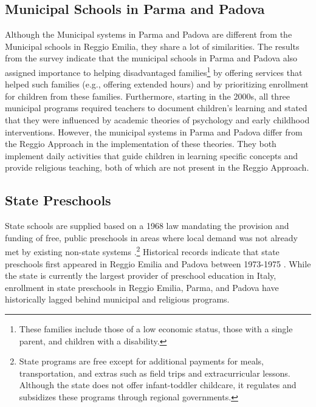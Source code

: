 \subsection{Municipal Schools in Parma and Padova}
Although the Municipal systems in Parma and Padova are different from the Municipal schools in Reggio Emilia, they share a lot of similarities. The results from the survey indicate that the municipal schools in Parma and Padova also assigned importance to helping disadvantaged families\footnote{These families include those of a low economic status, those with a single parent, and children with a disability.} by offering services that helped such families (e.g., offering extended hours) and by prioritizing enrollment for children from these families. Furthermore, starting in the 2000s, all three municipal programs required teachers to document children's learning and stated that they were influenced by academic theories of psychology and early childhood interventions. However, the municipal systems in Parma and Padova differ from the Reggio Approach in the implementation of these theories. They both implement daily activities that guide children in learning specific concepts and provide religious teaching, both of which are not present in the Reggio Approach. 


\subsection{State Preschools}
State schools are supplied based on a 1968 law mandating the provision and funding of free, public preschools in areas where local demand was not already met by existing non-state systems \citep{Hohnerlein_2009_Paradox-Public-Preschools}.\footnote{State programs are free except for additional payments for meals, transportation, and extras such as field trips and extracurricular lessons. Although the state does not offer infant-toddler childcare, it regulates and subsidizes these programs through regional governments.}  Historical records indicate that state preschools first appeared in Reggio Emilia and Padova between 1973-1975 \citep{Padova-Admin-Data_1964-2011,Reggio-Admin-data_1966-2006,Reggio-Annual-Journals_1994-2011}. While the state is currently the largest provider of preschool education in Italy, enrollment in state preschools in Reggio Emilia, Parma, and Padova have historically lagged behind municipal and religious programs.


